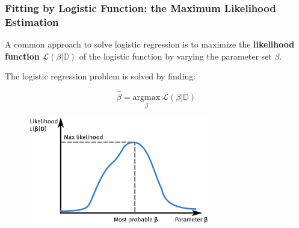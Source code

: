 \documentclass[10pt,aspectratio=169]{beamer}
\begin{document}
  \begin{frame}
    \frametitle{Fitting by Logistic Function: the Maximum Likelihood
      Estimation}

    A common approach to solve logistic regression is to maximize the
    \textbf{likelihood function} $\mathscr{L}(\beta|\mathbb{D})$ of
    the logistic function by varying the parameter set $\beta$.

    The logistic regression problem is solved by finding:

    \begin{equation*}
      \hat{\beta} = \underset{\beta}{\mathrm{argmax}}\ \mathscr{L}(\beta|\mathbb{D})
    \end{equation*}
    
    \begin{figure}[t] %
      \vspace{-2em}%
      \includegraphics[width=0.7\textwidth]{images/likelihood.pdf}
    \end{figure}

    
  \end{frame}
\end{document}
